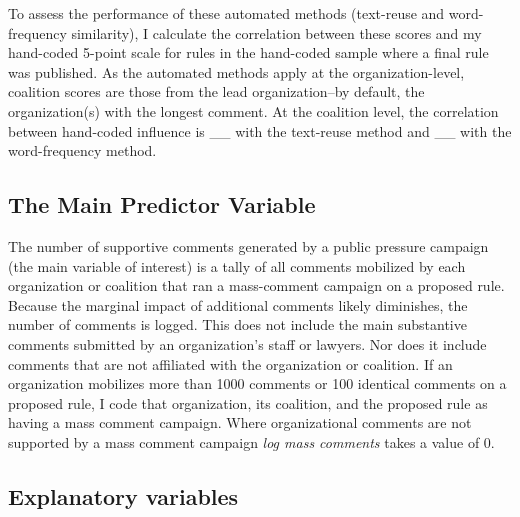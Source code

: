 \documentclass[
]{book}
\begin{document}
To assess the performance of these automated methods (text-reuse and word-frequency similarity), I calculate the correlation between these scores and my hand-coded 5-point scale for rules in the hand-coded sample where a final rule was published. As the automated methods apply at the organization-level, coalition scores are those from the lead organization--by default, the organization(s) with the longest comment. At the coalition level, the correlation between hand-coded influence is \_\_ with the text-reuse method and \_\_ with the word-frequency method.

\hypertarget{the-main-predictor-variable}{%
\subsection{The Main Predictor Variable}\label{the-main-predictor-variable}}

The number of supportive comments generated by a public pressure campaign (the main variable of interest) is a tally of all comments mobilized by each organization or coalition that ran a mass-comment campaign on a proposed rule. Because the marginal impact of additional comments likely diminishes, the number of comments is logged. This does not include the main substantive comments submitted by an organization's staff or lawyers. Nor does it include comments that are not affiliated with the organization or coalition. If an organization mobilizes more than 1000 comments or 100 identical comments on a proposed rule, I code that organization, its coalition, and the proposed rule as having a mass comment campaign. Where organizational comments are not supported by a mass comment campaign \emph{log mass comments} takes a value of 0.

\hypertarget{explanatory-variables}{%
\subsection{Explanatory variables}\label{explanatory-variables}}
\end{document}
